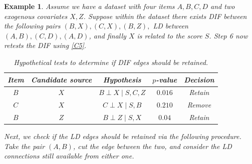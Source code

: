 \documentclass[a4project,12pt]{article}
\theoremstyle{examplestyle}
\newtheorem{example}{Example}[section]
\theoremstyle{defstyle}
\theoremstyle{thmstyle}
\begin{document}
\begin{mybox3}
    \begin{example}
        Assume we have a dataset with four items $A,B,C,D$ and two exogenous covariates $X,Z$. Suppose within the dataset there exists DIF between the following pairs $(B,X), (C,X), (B,Z),$ LD between $(A,B), (C,D), (A,D)$, and finally $X$ is related to the score $S$. Step 6 now retests the DIF using \eqref{C5}.
        \begin{table}[H]
        \centering
        \begin{tabular}{c c c c c}
            \hline
            Item & Candidate source & Hypothesis & $p$-value & Decision \\
            \hline
            $B$ & $X$ & $B \perp X \mid S, C,Z$ & $0.016$ & Retain\\
            $C$ & $X$ & $C \perp X \mid S,B$ & $0.210$ & Remove\\
            $B$ & $Z$ & $B \perp Z \mid S,X$ & $0.04$ & Retain \\
            \hline  
            \end{tabular}
            \caption{Hypothetical tests to determine if DIF edges should be retained.}
            \label{tab:step3_example_3b}
        \end{table}
        Next, we check if the LD edges should be retained via the following procedure. Take the pair $(A,B)$, cut the edge between the two, and consider the LD connections still available from either one.
\begin{center}
\end{center}
\end{example}
\end{mybox3}
\end{document}
